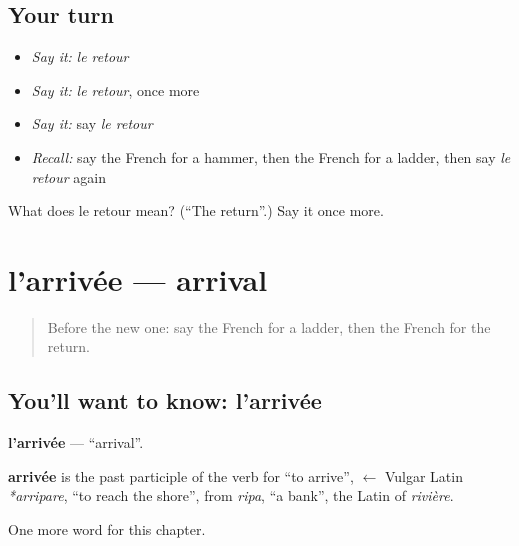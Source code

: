 \subsection*{Your turn}
\begin{itemize}
\raggedright
  \item \emph{Say it:} \emph{le retour}
  \item \emph{Say it:} \emph{le retour}, once more
  \item \emph{Say it:} say \emph{le retour}
  \item \emph{Recall:} say the French for a hammer, then the French for a ladder, then say \emph{le retour} again
\end{itemize}

\begin{tcolorbox}[breakable,colback=teal!4,colframe=teal!35!black,title={Before you move on}]
What does le retour mean? (\textquotedblleft{}The return\textquotedblright{}.) Say it once more.
\end{tcolorbox}
\section[l'arrivée]{l'arrivée — arrival}

\label{lesson:FR-C231-arrivee}



\begin{quote}
Before the new one: say the French for a ladder, then the French for the return.
\end{quote}

\subsection*{You'll want to know: l'arrivée}
\textbf{l'arrivée} — \textquotedblleft{}arrival\textquotedblright{}.

\begin{cousinweb}
\textbf{arrivée} is the past participle of the verb for \textquotedblleft{}to arrive\textquotedblright{}, $\leftarrow$ Vulgar Latin \emph{*arripare}, \textquotedblleft{}to reach the shore\textquotedblright{}, from \emph{ripa}, \textquotedblleft{}a bank\textquotedblright{}, the Latin of \emph{rivière}.
\end{cousinweb}

\begin{grammarlens}[title={What you've built}]
One more word for this chapter.
\end{grammarlens}

